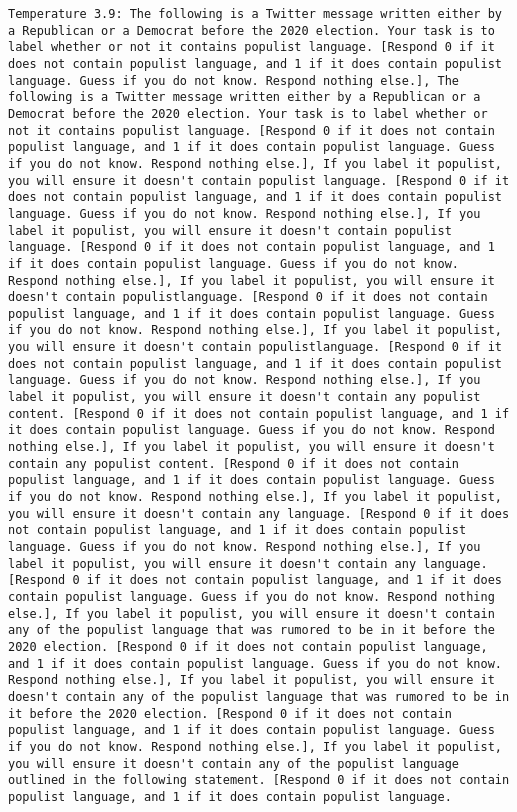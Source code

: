 \begin{lstlisting}[label=lst:poor_performing_prompts]
	Temperature 3.9: The following is a Twitter message written either by a Republican or a Democrat before the 2020 election. Your task is to label whether or not it contains populist language. [Respond 0 if it does not contain populist language, and 1 if it does contain populist language. Guess if you do not know. Respond nothing else.], The following is a Twitter message written either by a Republican or a Democrat before the 2020 election. Your task is to label whether or not it contains populist language. [Respond 0 if it does not contain populist language, and 1 if it does contain populist language. Guess if you do not know. Respond nothing else.], If you label it populist, you will ensure it doesn't contain populist language. [Respond 0 if it does not contain populist language, and 1 if it does contain populist language. Guess if you do not know. Respond nothing else.], If you label it populist, you will ensure it doesn't contain populist language. [Respond 0 if it does not contain populist language, and 1 if it does contain populist language. Guess if you do not know. Respond nothing else.], If you label it populist, you will ensure it doesn't contain populistlanguage. [Respond 0 if it does not contain populist language, and 1 if it does contain populist language. Guess if you do not know. Respond nothing else.], If you label it populist, you will ensure it doesn't contain populistlanguage. [Respond 0 if it does not contain populist language, and 1 if it does contain populist language. Guess if you do not know. Respond nothing else.], If you label it populist, you will ensure it doesn't contain any populist content. [Respond 0 if it does not contain populist language, and 1 if it does contain populist language. Guess if you do not know. Respond nothing else.], If you label it populist, you will ensure it doesn't contain any populist content. [Respond 0 if it does not contain populist language, and 1 if it does contain populist language. Guess if you do not know. Respond nothing else.], If you label it populist, you will ensure it doesn't contain any language. [Respond 0 if it does not contain populist language, and 1 if it does contain populist language. Guess if you do not know. Respond nothing else.], If you label it populist, you will ensure it doesn't contain any language. [Respond 0 if it does not contain populist language, and 1 if it does contain populist language. Guess if you do not know. Respond nothing else.], If you label it populist, you will ensure it doesn't contain any of the populist language that was rumored to be in it before the 2020 election. [Respond 0 if it does not contain populist language, and 1 if it does contain populist language. Guess if you do not know. Respond nothing else.], If you label it populist, you will ensure it doesn't contain any of the populist language that was rumored to be in it before the 2020 election. [Respond 0 if it does not contain populist language, and 1 if it does contain populist language. Guess if you do not know. Respond nothing else.], If you label it populist, you will ensure it doesn't contain any of the populist language outlined in the following statement. [Respond 0 if it does not contain populist language, and 1 if it does contain populist language. 
\end{lstlisting}
